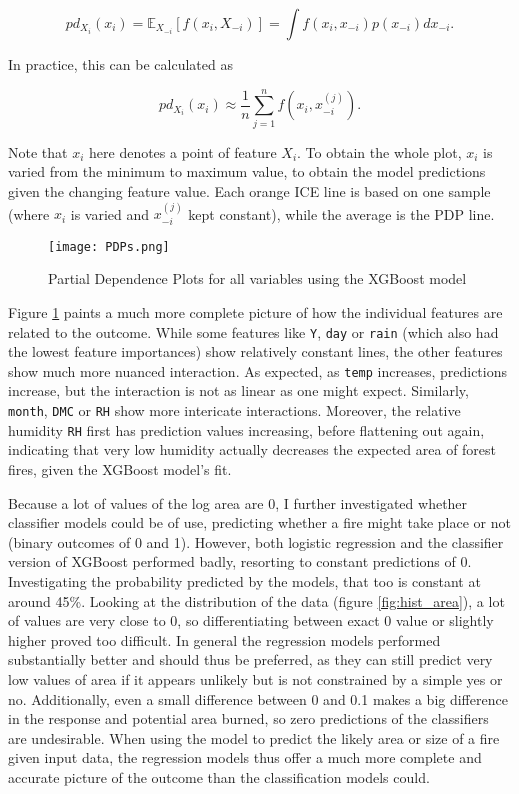 \documentclass{article}
\begin{document}
\begin{equation}
    \label{eq:pdp}
    pd_{X_i}(x_i) = \mathbb E_{X_{-i}} [f(x_i, X_{-i})] = \int f(x_i, x_{-i})p(x_{-i}) dx_{-i}.
\end{equation}

In practice, this can be calculated as 

\begin{equation}
    pd_{X_i}(x_i) \approx \frac{1}{n} \sum_{j=1}^n f(x_i, x_{-i}^{(j)}).
\end{equation}

Note that $x_i$ here denotes a point of feature $X_i$. To obtain the whole plot, $x_i$ is varied from the minimum to maximum value, to obtain the model predictions given the changing feature value. Each orange ICE line is based on one sample (where $x_i$ is varied and $x_{-i}^{(j)}$ kept constant), while the average is the PDP line.


\begin{figure}[!htbp]
    \centering
    \texttt{[image: PDPs.png]}
    \caption{Partial Dependence Plots for all variables using the XGBoost model}
    \label{fig:pdps}
\end{figure}

Figure \ref{fig:pdps} paints a much more complete picture of how the individual features are related to the outcome. While some features like \texttt{Y}, \texttt{day} or \texttt{rain} (which also had the lowest feature importances) show relatively constant lines, the other features show much more nuanced interaction. As expected, as \texttt{temp} increases, predictions increase, but the interaction is not as linear as one might expect. Similarly, \texttt{month}, \texttt{DMC} or \texttt{RH} show more intericate interactions. Moreover, the relative humidity \texttt{RH} first has prediction values increasing, before flattening out again, indicating that very low humidity actually decreases the expected area of forest fires, given the XGBoost model's fit.

Because a lot of values of the log area are 0, I further investigated whether classifier models could be of use, predicting whether a fire might take place or not (binary outcomes of 0 and 1). However, both logistic regression and the classifier version of XGBoost performed badly, resorting to constant predictions of 0. Investigating the probability predicted by the models, that too is constant at around 45\%. Looking at the distribution of the data (figure \ref{fig:hist_area}), a lot of values are very close to 0, so differentiating between exact 0 value or slightly higher proved too difficult. In general the regression models performed substantially better and should thus be preferred, as they can still predict very low values of area if it appears unlikely but is not constrained by a simple yes or no. Additionally, even a small difference between 0 and 0.1 makes a big difference in the response and potential area burned, so zero predictions of the classifiers are undesirable. When using the model to predict the likely area or size of a fire given input data, the regression models thus offer a much more complete and accurate picture of the outcome than the classification models could. 
\end{document}
